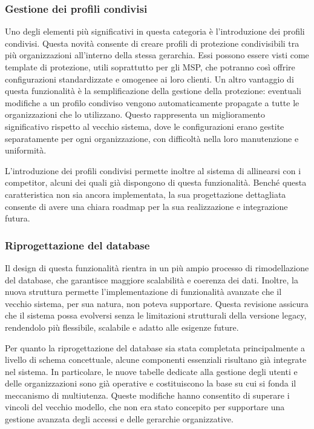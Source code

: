 \subsubsection{Gestione dei profili condivisi}
Uno degli elementi più significativi in questa categoria è l’introduzione dei profili condivisi. Questa novità consente di creare profili di protezione condivisibili tra più organizzazioni all'interno della stessa gerarchia. Essi possono essere visti come template di protezione, utili soprattutto per gli MSP, che potranno così offrire configurazioni standardizzate e omogenee ai loro clienti. Un altro vantaggio di questa funzionalità è la semplificazione della gestione della protezione: eventuali modifiche a un profilo condiviso vengono automaticamente propagate a tutte le organizzazioni che lo utilizzano. Questo rappresenta un miglioramento significativo rispetto al vecchio sistema, dove le configurazioni erano gestite separatamente per ogni organizzazione, con difficoltà nella loro manutenzione e uniformità.

L’introduzione dei profili condivisi permette inoltre al sistema di allinearsi con i competitor, alcuni dei quali già dispongono di questa funzionalità. Benché questa caratteristica non sia ancora implementata, la sua progettazione dettagliata consente di avere una chiara roadmap per la sua realizzazione e integrazione futura.

\subsubsection{Riprogettazione del database}
Il design di questa funzionalità rientra in un più ampio processo di rimodellazione del database, che garantisce maggiore scalabilità e coerenza dei dati. Inoltre, la nuova struttura permette l’implementazione di funzionalità avanzate che il vecchio sistema, per sua natura, non poteva supportare. Questa revisione assicura che il sistema possa evolversi senza le limitazioni strutturali della versione legacy, rendendolo più flessibile, scalabile e adatto alle esigenze future.

Per quanto la riprogettazione del database sia stata completata principalmente a livello di schema concettuale, alcune componenti essenziali risultano già integrate nel sistema. In particolare, le nuove tabelle dedicate alla gestione degli utenti e delle organizzazioni sono già operative e costituiscono la base su cui si fonda il meccanismo di multiutenza. Queste modifiche hanno consentito di superare i vincoli del vecchio modello, che non era stato concepito per supportare una gestione avanzata degli accessi e delle gerarchie organizzative.

